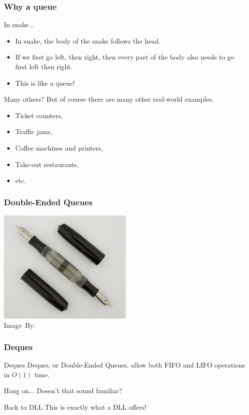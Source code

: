 \begin{frame}
	\frametitle{Why a queue}
		\begin{block}{In snake...}
			\begin{itemize}
				\item In snake, the body of the snake follows the head.
					\pause
				\item If we first go left, then right, then every part of the body also needs to go first left then right.
					\pause
				\item This is like a queue!
			\end{itemize}
		\end{block}	
		\pause
			\begin{block}{Many others?}
				But of course there are many other real-world examples.
				\begin{itemize}
					\item Ticket counters,
					\item Traffic jams,
					\item Coffee machines and printers,
					\item Take-out restaurants,
					\item etc.
				\end{itemize}
			\end{block}	
\end{frame}

\begin{frame}
	\frametitle{Double-Ended Queues}

	\begin{center}
		\includegraphics[width=0.5\textwidth]{images/de.jpg}\\
		\hspace*{15pt}\hbox{\scriptsize Image By:}
	\end{center}
\end{frame}

\begin{frame}
	\frametitle{Deques}
		\begin{block}{Deques}
			Deques, or Double-Ended Queues, allow both FIFO and LIFO operations in $O(1)$ time.
		\end{block}		
		\pause
		\begin{block}{Hang on...}
			Doesn't that sound familiar?	
		\end{block}
		\pause
		\begin{block}{Back to DLL}
			This is exactly what a DLL offers!
		\end{block}
\end{frame}

